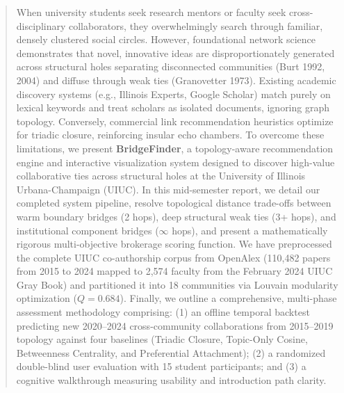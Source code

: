 \date{October 30, 2026}

\maketitle

\begin{abstract}
When university students seek research mentors or faculty seek cross-disciplinary collaborators, they overwhelmingly search through familiar, densely clustered social circles. However, foundational network science demonstrates that novel, innovative ideas are disproportionately generated across structural holes separating disconnected communities (Burt 1992, 2004) and diffuse through weak ties (Granovetter 1973). Existing academic discovery systems (e.g., Illinois Experts, Google Scholar) match purely on lexical keywords and treat scholars as isolated documents, ignoring graph topology. Conversely, commercial link recommendation heuristics optimize for triadic closure, reinforcing insular echo chambers. To overcome these limitations, we present \textbf{BridgeFinder}, a topology-aware recommendation engine and interactive visualization system designed to discover high-value collaborative ties across structural holes at the University of Illinois Urbana-Champaign (UIUC). In this mid-semester report, we detail our completed system pipeline, resolve topological distance trade-offs between warm boundary bridges (2 hops), deep structural weak ties (3+ hops), and institutional component bridges ($\infty$ hops), and present a mathematically rigorous multi-objective brokerage scoring function. We have preprocessed the complete UIUC co-authorship corpus from OpenAlex (110,482 papers from 2015 to 2024 mapped to 2,574 faculty from the February 2024 UIUC Gray Book) and partitioned it into 18 communities via Louvain modularity optimization ($Q = 0.684$). Finally, we outline a comprehensive, multi-phase assessment methodology comprising: (1) an offline temporal backtest predicting new 2020--2024 cross-community collaborations from 2015--2019 topology against four baselines (Triadic Closure, Topic-Only Cosine, Betweenness Centrality, and Preferential Attachment); (2) a randomized double-blind user evaluation with 15 student participants; and (3) a cognitive walkthrough measuring usability and introduction path clarity.
\end{abstract}


